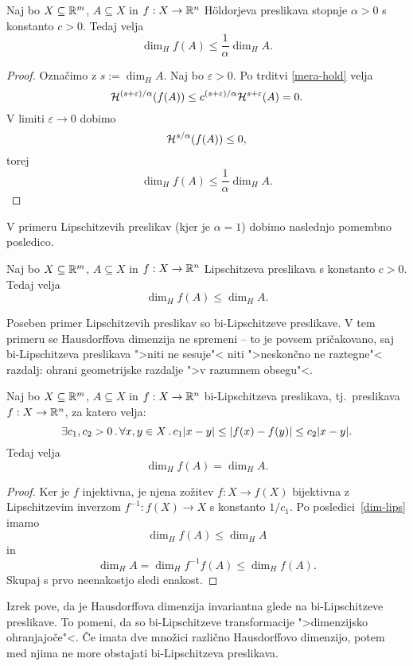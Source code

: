 \begin{trditev}
    Naj bo \(X \subseteq \mathbb{R}^m\), \(A \subseteq X\) in \(f: X \to \mathbb{R}^n\) H\"oldorjeva preslikava stopnje \(\alpha > 0\) s konstanto \(c > 0\). Tedaj velja
    \[\dim_H f(A) \leq \frac{1}{\alpha} \dim_H A.\]
\end{trditev}

\begin{proof}
    Označimo z \(s:= \dim_H A\). Naj bo \(\varepsilon > 0\). Po trditvi \ref{mera-hold} velja
    \[\mathcal{H}^{(s +\varepsilon) / \alpha}(f(A)) \leq c^{(s +\varepsilon) / \alpha} \mathcal{H}^{s + \varepsilon}(A) = 0.\]
    V limiti \(\varepsilon \to 0\) dobimo
    \[\mathcal{H}^{s / \alpha}(f(A)) \leq 0,\]
    torej
    \[\dim_H f(A) \leq \frac{1}{\alpha} \dim_H A.\]
\end{proof}

V primeru Lipschitzevih preslikav (kjer je \(\alpha = 1\)) dobimo naslednjo pomembno posledico.

\begin{posledica}
    \label{dim-lips}
    Naj bo \(X \subseteq \mathbb{R}^m\), \(A \subseteq X\) in \(f: X \to \mathbb{R}^n\) Lipschitzeva preslikava s konstanto \(c > 0\). Tedaj velja
    \[\dim_H f(A) \leq \dim_H A.\]
\end{posledica}

Poseben primer Lipschitzevih preslikav so bi-Lipschitzeve preslikave. V tem primeru se Hausdorffova dimenzija ne spremeni -- to je povsem pričakovano, saj bi-Lipschitzeva preslikava ">niti ne sesuje"< niti ">neskončno ne raztegne"< razdalj: ohrani geometrijske razdalje ">v razumnem obsegu"<.

\begin{izrek}
    Naj bo \(X \subseteq \mathbb{R}^m\), \(A \subseteq X\) in \(f: X \to \mathbb{R}^n\) bi-Lipschitzeva preslikava, tj.\ preslikava \(f: X \to \mathbb{R}^n\), za katero velja:
    \[\exists c_1, c_2 > 0 \,.\, \forall x, y \in X \,.\, c_1|x-y| \leq |f(x) - f(y)| \leq c_2|x-y|.\]
    Tedaj velja
    \[\dim_H f(A) = \dim_H A.\]
\end{izrek}

\begin{proof}
    Ker je \(f\) injektivna, je njena zožitev \(f: X \to f(X)\) bijektivna z Lipschitzevim inverzom \(f^{-1}: f(X) \to X\) s konstanto \(1 / c_1\). Po posledici~\ref{dim-lips} imamo
    \[\dim_H f(A) \leq \dim_H A\]
    in 
    \[\dim_H A = \dim_H f^{-1}f(A) \leq \dim_H f(A).\]
    Skupaj s prvo neenakostjo sledi enakost.
\end{proof}

Izrek pove, da je Hausdorffova dimenzija invariantna glede na bi-Lipschit\-zeve preslikave. To pomeni, da so bi-Lipschitzeve transformacije ">dimenzijsko ohranjajoče"<. Če imata dve množici različno Hausdorffovo dimenzijo, potem med njima ne more obstajati bi-Lipschitzeva preslikava.

